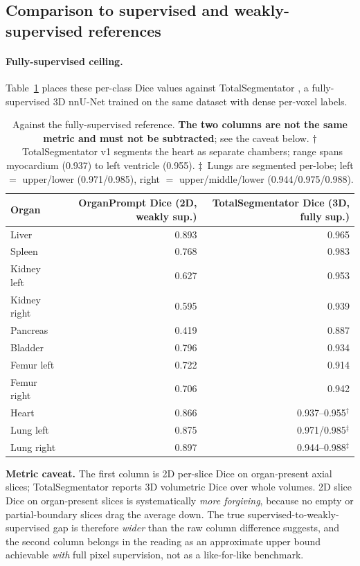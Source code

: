 \subsection{Comparison to supervised and weakly-supervised references}
\label{sec:results:comparison}

\paragraph{Fully-supervised ceiling.}
Table~\ref{tab:fullysup} places these per-class Dice values against TotalSegmentator
\cite{wasserthal2023totalsegmentator}, a fully-supervised 3D nnU-Net
\cite{isensee2021nnunet} trained on the same dataset with dense per-voxel
labels.

\begin{table}[t]
\centering
\caption{Against the fully-supervised reference. \textbf{The two columns are not
the same metric and must not be subtracted}; see the caveat below.
$\dagger$~TotalSegmentator v1 segments the heart as separate chambers; range
spans myocardium (0.937) to left ventricle (0.955). $\ddagger$~Lungs are
segmented per-lobe; left $=$ upper/lower (0.971/0.985), right $=$
upper/middle/lower (0.944/0.975/0.988).}
\label{tab:fullysup}
\begin{tabular}{lrr}
\toprule
Organ & OrganPrompt Dice (2D, weakly sup.) & TotalSegmentator Dice (3D, fully sup.) \\
\midrule
Liver        & 0.893 & 0.965 \\
Spleen       & 0.768 & 0.983 \\
Kidney left  & 0.627 & 0.953 \\
Kidney right & 0.595 & 0.939 \\
Pancreas     & 0.419 & 0.887 \\
Bladder      & 0.796 & 0.934 \\
Femur left   & 0.722 & 0.914 \\
Femur right  & 0.706 & 0.942 \\
Heart        & 0.866 & 0.937--0.955$^\dagger$ \\
Lung left    & 0.875 & 0.971/0.985$^\ddagger$ \\
Lung right   & 0.897 & 0.944--0.988$^\ddagger$ \\
\bottomrule
\end{tabular}
\end{table}

\textbf{Metric caveat.} The first column is 2D per-slice Dice on organ-present
axial slices; TotalSegmentator reports 3D volumetric Dice over whole volumes. 2D
slice Dice on organ-present slices is systematically \emph{more forgiving},
because no empty or partial-boundary slices drag the average down. The true
supervised-to-weakly-supervised gap is therefore \emph{wider} than the raw
column difference suggests, and the second column belongs in the reading as an
approximate upper bound achievable \emph{with} full pixel supervision, not as a
like-for-like benchmark.


